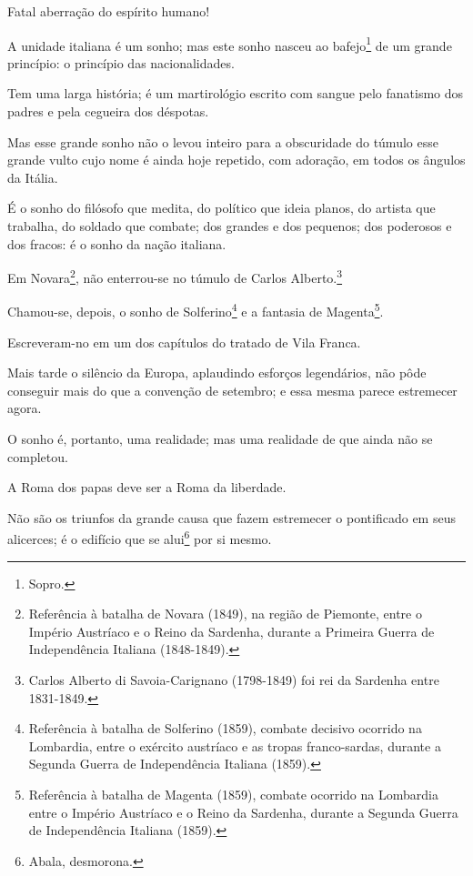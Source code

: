 Fatal aberração do espírito humano!

A unidade italiana é um sonho; mas este sonho nasceu ao
bafejo\footnote{Sopro.} de um grande princípio: o princípio das
nacionalidades.

Tem uma larga história; é um martirológio escrito com sangue pelo
fanatismo dos padres e pela cegueira dos déspotas.

Mas esse grande sonho não o levou inteiro para a obscuridade do túmulo
esse grande vulto cujo nome é ainda hoje repetido, com adoração, em
todos os ângulos da Itália.

É o sonho do filósofo que medita, do político que ideia planos, do
artista que trabalha, do soldado que combate; dos grandes e dos
pequenos; dos poderosos e dos fracos: é o sonho da nação italiana.

Em Novara\footnote{Referência à batalha de Novara (1849), na região de
  Piemonte, entre o Império Austríaco e o Reino da Sardenha, durante a
  Primeira Guerra de Independência Italiana (1848-1849).}, não
enterrou-se no túmulo de Carlos Alberto.\footnote{Carlos Alberto di
  Savoia-Carignano (1798-1849) foi rei da Sardenha entre 1831-1849.}

Chamou-se, depois, o sonho de Solferino\footnote{Referência à batalha
  de Solferino (1859), combate decisivo ocorrido na Lombardia, entre o
  exército austríaco e as tropas franco-sardas, durante a Segunda Guerra
  de Independência Italiana (1859).} e a fantasia de Magenta\footnote{
  Referência à batalha de Magenta (1859), combate ocorrido na Lombardia
  entre o Império Austríaco e o Reino da Sardenha, durante a Segunda
  Guerra de Independência Italiana (1859).}.

Escreveram-no em um dos capítulos do tratado de Vila Franca.

Mais tarde o silêncio da Europa, aplaudindo esforços legendários, não
pôde conseguir mais do que a convenção de setembro; e essa mesma parece
estremecer agora.

O sonho é, portanto, uma realidade; mas uma realidade de que ainda não
se completou.

A Roma dos papas deve ser a Roma da liberdade.

Não são os triunfos da grande causa que fazem estremecer o pontificado
em seus alicerces; é o edifício que se alui\footnote{Abala, desmorona.}
por si mesmo.

